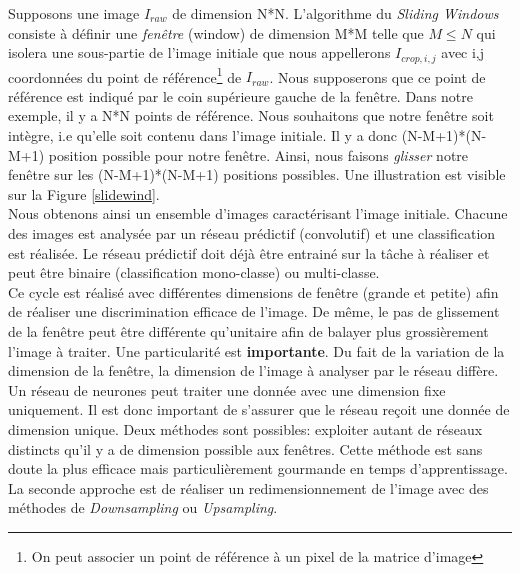 \noindent Supposons une image $I_{raw}$ de dimension N*N. L'algorithme du \textit{Sliding Windows} consiste à définir une \textit{fenêtre} (window) de dimension M*M telle que $M \leq N$ qui isolera une sous-partie de l'image initiale que nous appellerons $I_{crop,i,j}$ avec i,j coordonnées du point de référence\footnote{On peut associer un point de référence à un pixel de la matrice d'image} de $I_{raw}$. Nous supposerons que ce point de référence est indiqué par le coin supérieure gauche de la fenêtre. Dans notre exemple, il y a N*N points de référence. Nous souhaitons que notre fenêtre soit intègre, i.e qu'elle soit contenu dans l'image initiale. Il y a donc (N-M+1)*(N-M+1) position possible pour notre fenêtre. Ainsi, nous faisons \textit{glisser} notre fenêtre sur les (N-M+1)*(N-M+1) positions possibles. Une illustration est visible sur la Figure \ref{slidewind}.\\

\noindent Nous obtenons ainsi un ensemble d'images caractérisant l'image initiale. Chacune des images est analysée par un réseau prédictif (convolutif) et une classification est réalisée. Le réseau prédictif doit déjà être entrainé sur la tâche à réaliser et peut être binaire (classification mono-classe) ou multi-classe.\\

\noindent Ce cycle est réalisé avec différentes dimensions de fenêtre (grande et petite) afin de réaliser une discrimination efficace de l'image. De même, le pas de glissement de la fenêtre peut être différente qu'unitaire afin de balayer plus grossièrement l'image à traiter. Une particularité est \textbf{importante}. Du fait de la variation de la dimension de la fenêtre, la dimension de l'image à analyser par le réseau diffère. Un réseau de neurones peut traiter une donnée avec une dimension fixe uniquement. Il est donc important de s'assurer que le réseau reçoit une donnée de dimension unique. Deux méthodes sont possibles: exploiter autant de réseaux distincts qu'il y a de dimension possible aux fenêtres. Cette méthode est sans doute la plus efficace mais particulièrement gourmande en temps d'apprentissage. La seconde approche est de réaliser un redimensionnement de l'image avec des méthodes de \textit{Downsampling} ou \textit{Upsampling}.\\

